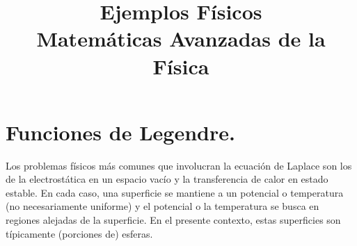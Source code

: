
\title{Ejemplos Físicos \\ {\large Matemáticas Avanzadas de la Física}}
\date{ }

\maketitle
\fontsize{14}{14}\selectfont
\section{Funciones de Legendre.}
Los problemas físicos más comunes que involucran la ecuación de Laplace son los de la electrostática en un espacio vacío y la transferencia de calor en estado estable. En cada caso, una superficie se mantiene a un potencial o temperatura (no necesariamente uniforme) y el potencial o la temperatura se busca en regiones alejadas de la superficie. En el presente contexto, estas superficies son típicamente (porciones de) esferas.
